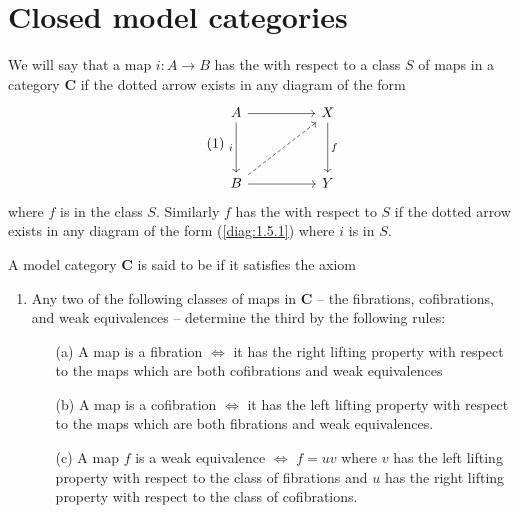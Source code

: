 \documentclass[../main]{subfiles}
\begin{document}
\section{Closed model categories}\label{sec:1.5}
We will say that a map $i : A \longrightarrow B$ has the  with respect to a class $S$ of maps in a category $\mathbf C$ if the dotted arrow exists in any diagram of the form
\[\tag{1}\label{diag:1.5.1}
    \begin{tikzcd}
    A \arrow[dd, "i"'] \arrow[rr]     &  & X \arrow[dd, "f"] \\
                                      &  &                   \\
    B \arrow[rr] \arrow[rruu, dashed] &  & Y                
    \end{tikzcd}
\]
where $f$ is in the class $S$. Similarly $f$ has the  with respect to $S$ if the dotted arrow exists in any diagram of the form (\ref{diag:1.5.1}) where $i$ is in $S$.

\begin{definition}
A model category $\mathbf C$ is said to be  if it satisfies the axiom

\begin{enumerate}[label = M6]
    \item\label{M6} Any two of the following classes of maps in $\mathbf C$ -- the fibrations, cofibrations, and weak equivalences -- determine the third by the following rules:

\begin{itemize}
    \item[(a)] A map is a fibration $\iff$ it has the right lifting property with respect to the maps which are both cofibrations and weak equivalences
    \item[(b)] A map is a cofibration $\iff$ it has the left lifting property with respect to the maps which are both fibrations and weak equivalences.
    \item[(c)] A map $f$ is a weak equivalence $\iff$ $f = uv$ where $v$ has the left lifting property with respect to the class of fibrations and $u$ has the right lifting property with respect to the class of cofibrations.
\end{itemize} \end{enumerate}
\end{definition} 
\end{document}
